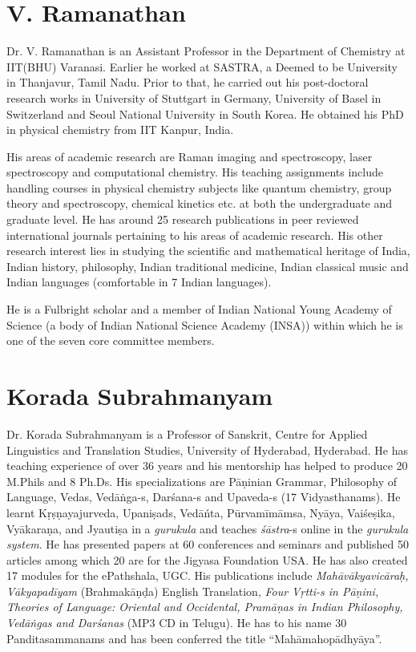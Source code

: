 \section*{V. Ramanathan}

Dr. V. Ramanathan is an Assistant Professor in the Department of Chemistry at IIT(BHU) Varanasi. Earlier he worked at SASTRA, a Deemed to be University in Thanjavur, Tamil Nadu. Prior to that, he carried out his post-doctoral research works in University of Stuttgart in Germany, University of Basel in Switzerland and Seoul National University in South Korea. He obtained his PhD in physical chemistry from IIT Kanpur, India.

His areas of academic research are Raman imaging and spectroscopy, laser spectroscopy and computational chemistry. His teaching assignments include handling courses in physical chemistry subjects like quantum chemistry, group theory and spectroscopy, chemical kinetics etc. at both the undergraduate and graduate level. He has around 25 research publications in peer reviewed international journals pertaining to his areas of academic research. His other research interest lies in studying the scientific and mathematical heritage of India, Indian history, philosophy, Indian traditional medicine, Indian classical music and Indian languages (comfortable in 7 Indian languages).

He is a Fulbright scholar and a member of Indian National Young Academy of Science (a body of Indian National Science Academy (INSA)) within which he is one of the seven core committee members.


\section*{Korada Subrahmanyam }

Dr. Korada Subrahmanyam is a Professor of Sanskrit, Centre for Applied Linguistics and Translation Studies, University of Hyderabad, Hyderabad. He has teaching experience of over 36 years and his mentorship has helped to produce 20 M.Phils and 8 Ph.Ds. His specializations are Pāṇinian Grammar, Philosophy of Language, Vedas, Vedāṅga-s, Darśana-s and Upaveda-s (17 Vidyasthanams). He learnt Kṛṣṇayajurveda, Upaniṣads, Vedāńta, Pūrvamīmāmsa, Nyāya, Vaiśeṣika, Vyākaraṇa, and Jyautiṣa in a \textit{gurukula} and teaches \textit{śāstra}-s online in the \textit{gurukula system}. He has presented papers at 60 conferences and seminars and published 50 articles among which 20 are for the Jigyasa Foundation USA. He has also created 17 modules for the ePathshala, UGC. His publications include \textit{Mahāvākyavicāraḥ, Vākyapadīyam} (Brahmakāṇḍa) English Translation, \textit{Four Vṛtti-s in Pāṇini, Theories of Language: Oriental and Occidental, Pramāṇas in Indian Philosophy, Vedāṅgas and Darśanas} (MP3 CD in Telugu). He has to his name 30 Panditasammanams and has been conferred the title “Mahāmahopādhyāya”.

